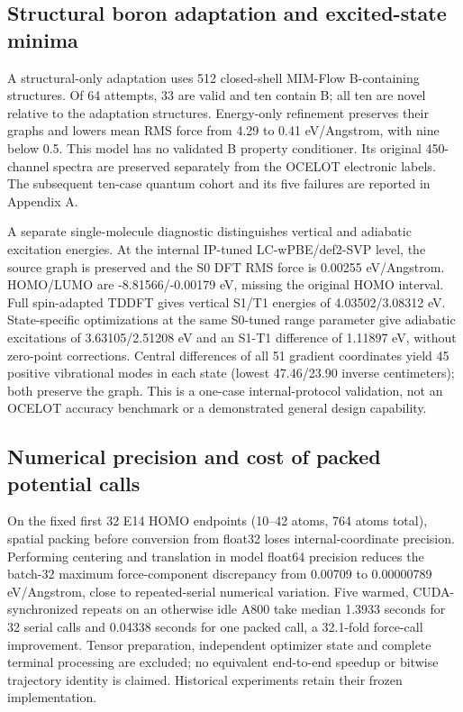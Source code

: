 \documentclass[11pt,a4paper]{article}
\begin{document}
\FloatBarrier
\subsection{Structural boron adaptation and excited-state
minima}\label{structural-boron-adaptation-and-excited-state-minima}

A structural-only adaptation uses 512 closed-shell MIM-Flow B-containing
structures. Of 64 attempts, 33 are valid and ten contain B; all ten are
novel relative to the adaptation structures. Energy-only refinement
preserves their graphs and lowers mean RMS force from 4.29 to 0.41
eV/Angstrom, with nine below 0.5. This model has no validated B property
conditioner. Its original 450-channel spectra are preserved separately
from the OCELOT electronic labels. The subsequent ten-case quantum
cohort and its five failures are reported in Appendix A.

A separate single-molecule diagnostic distinguishes vertical and
adiabatic excitation energies. At the internal IP-tuned LC-wPBE/def2-SVP
level, the source graph is preserved and the S0 DFT RMS force is 0.00255
eV/Angstrom. HOMO/LUMO are -8.81566/-0.00179 eV, missing the original
HOMO interval. Full spin-adapted TDDFT gives vertical S1/T1 energies of
4.03502/3.08312 eV. State-specific optimizations at the same S0-tuned
range parameter give adiabatic excitations of 3.63105/2.51208 eV and an
S1-T1 difference of 1.11897 eV, without zero-point corrections. Central
differences of all 51 gradient coordinates yield 45 positive vibrational
modes in each state (lowest 47.46/23.90 inverse centimeters); both
preserve the graph. This is a one-case internal-protocol validation, not
an OCELOT accuracy benchmark or a demonstrated general design
capability.

\FloatBarrier
\subsection{Numerical precision and cost of packed potential
calls}\label{numerical-precision-and-cost-of-packed-potential-calls}

On the fixed first 32 E14 HOMO endpoints (10--42 atoms, 764 atoms
total), spatial packing before conversion from float32 loses
internal-coordinate precision. Performing centering and translation in
model float64 precision reduces the batch-32 maximum force-component
discrepancy from 0.00709 to 0.00000789 eV/Angstrom, close to
repeated-serial numerical variation. Five warmed, CUDA-synchronized
repeats on an otherwise idle A800 take median 1.3933 seconds for 32
serial calls and 0.04338 seconds for one packed call, a 32.1-fold
force-call improvement. Tensor preparation, independent optimizer state
and complete terminal processing are excluded; no equivalent end-to-end
speedup or bitwise trajectory identity is claimed. Historical
experiments retain their frozen implementation.
\end{document}
